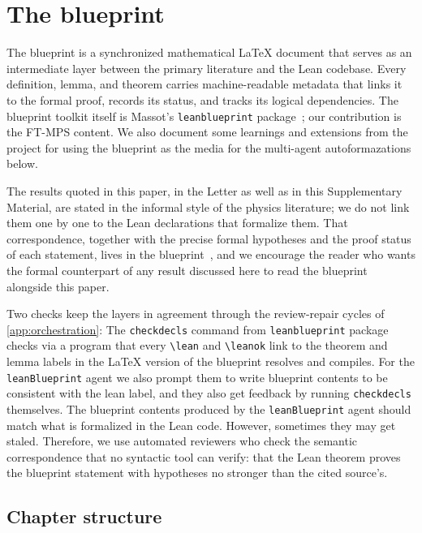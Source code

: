 \section{The blueprint}\label{app:blueprint}

The blueprint is a synchronized mathematical \LaTeX{} document that serves as an intermediate layer between the primary literature and the Lean codebase. Every definition, lemma, and theorem carries machine-readable metadata that links it to the formal proof, records its status, and tracks its logical dependencies. The blueprint toolkit itself is Massot's \texttt{leanblueprint} package~\cite{Massot2021Leanblueprint}; our contribution is the FT-MPS content. We also document some learnings and extensions from the project for using the blueprint as the media for the multi-agent autoformazations below.

The results quoted in this paper, in the Letter as well as in this Supplementary Material, are stated in the informal style of the physics literature; we do not link them one by one to the Lean declarations that formalize them. That correspondence, together with the precise formal hypotheses and the proof status of each statement, lives in the blueprint~\cite{TNLeanBlueprint}, and we encourage the reader who wants the formal counterpart of any result discussed here to read the blueprint alongside this paper.

Two checks keep the layers in agreement through the review-repair cycles of \cref{app:orchestration}:
The \texttt{checkdecls} command from \texttt{leanblueprint} package  checks via a program that every \texttt{\textbackslash{}lean} and \texttt{\textbackslash{}leanok} link to the theorem and lemma labels in the \LaTeX{} version of the blueprint resolves and compiles. For the \texttt{leanBlueprint} agent we also prompt them to write blueprint contents to be consistent with the lean label, and they also get feedback by running \texttt{checkdecls} themselves. The blueprint contents produced by the \texttt{leanBlueprint} agent should match what is formalized in the Lean code. However, sometimes they may get staled. Therefore, we use automated reviewers who check the semantic correspondence that no syntactic tool can verify: that the Lean theorem proves the blueprint statement with hypotheses no stronger than the cited source's.

\subsection{Chapter structure}\label{sec:bp_chapters}


